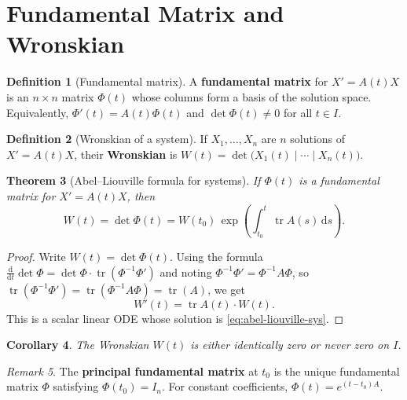 \documentclass[12pt,a4paper,openany]{book}
\theoremstyle{definition}
\newtheorem{definition}{Definition}[chapter]
\theoremstyle{plain}
\newtheorem{theorem}[definition]{Theorem}
\newtheorem{corollary}[definition]{Corollary}
\theoremstyle{remark}
\newtheorem{remark}[definition]{Remark}
\newcommand{\dd}{\mathrm{d}}
\DeclareMathOperator{\tr}{tr}
\begin{document}
\section{Fundamental Matrix and Wronskian}\label{sec:fundamental-matrix}

\begin{definition}[Fundamental matrix]\label{def:fundamental-matrix}
A \textbf{fundamental matrix} for $X'=A(t)X$ is an $n\times n$ matrix
$\Phi(t)$ whose columns form a basis of the solution space.  Equivalently,
$\Phi'(t)=A(t)\Phi(t)$ and $\det\Phi(t)\neq 0$ for all $t\in I$.
\end{definition}

\begin{definition}[Wronskian of a system]\label{def:wronskian-sys}
If $X_1,\dots,X_n$ are $n$ solutions of $X'=A(t)X$, their
\textbf{Wronskian} is $W(t) = \det\bigl(X_1(t)\mid\cdots\mid X_n(t)\bigr)$.
\end{definition}

\begin{theorem}[Abel--Liouville formula for systems]\label{thm:abel-liouville-sys}
If $\Phi(t)$ is a fundamental matrix for $X'=A(t)X$, then
\begin{equation}\label{eq:abel-liouville-sys}
  W(t) = \det\Phi(t) = W(t_0)\,\exp\!\left(\int_{t_0}^{t}\tr A(s)\,\dd s\right).
\end{equation}
\end{theorem}

\begin{proof}
Write $W(t)=\det\Phi(t)$.  Using the formula
$\frac{\dd}{\dd t}\det\Phi = \det\Phi\cdot\tr(\Phi^{-1}\Phi')$
and noting $\Phi^{-1}\Phi' = \Phi^{-1}A\Phi$, so
$\tr(\Phi^{-1}\Phi') = \tr(\Phi^{-1}A\Phi)=\tr(A)$, we get
\[
  W'(t) = \tr A(t)\cdot W(t).
\]
This is a scalar linear ODE whose solution is \eqref{eq:abel-liouville-sys}.
\end{proof}

\begin{corollary}\label{cor:wronskian-zero}
The Wronskian $W(t)$ is either identically zero or never zero on $I$.
\end{corollary}

\begin{remark}\label{rem:principal-matrix}
The \textbf{principal fundamental matrix}
at $t_0$ is the unique fundamental matrix $\Phi$ satisfying
$\Phi(t_0)=I_n$.  For constant coefficients, $\Phi(t)=e^{(t-t_0)A}$.
\end{remark}
\end{document}

